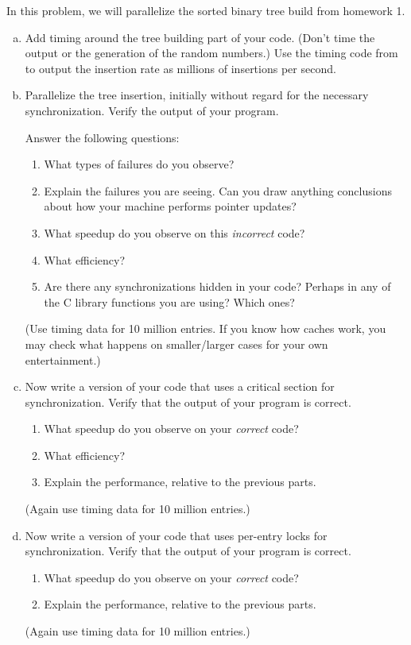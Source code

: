 \documentclass[11pt]{article}
\begin{document}

In this problem, we will parallelize the sorted binary tree build from
homework 1.

\begin{enumerate}[a)]
  \item Add timing around the tree building part of your code. (Don't
  time the output or the generation of the random numbers.)
  Use the timing code from
  to output the insertion rate as millions of insertions per second.

  \item Parallelize the tree insertion, initially without regard for
  the necessary synchronization. Verify the output of your program.

  Answer the following questions:
  \begin{enumerate}[1)]
    \item What types of failures do you observe?
    \item Explain the failures you are seeing. Can you draw anything
      conclusions about how your machine performs pointer updates?
    \item What speedup do you observe on this \emph{incorrect} code?
    \item What efficiency?
    \item Are there any synchronizations hidden in your code? Perhaps
      in any of the C library functions you are using? Which ones?
  \end{enumerate}
  (Use timing data for 10 million entries. If you know how caches
  work, you may check what happens on smaller/larger cases for your
  own entertainment.)

  \item Now write a version of your code that uses a critical section
  for synchronization. Verify that the output of your program is
  correct.
  \begin{enumerate}[1)]
    \item What speedup do you observe on your \emph{correct} code?
    \item What efficiency?
    \item Explain the performance, relative to the previous
    parts.
  \end{enumerate}
  (Again use timing data for 10 million entries.)

  \item Now write a version of your code that uses per-entry locks
  for synchronization. Verify that the output of your program is
  correct.
  \begin{enumerate}[1)]
    \item What speedup do you observe on your \emph{correct} code?
    \item Explain the performance, relative to the previous
    parts.
  \end{enumerate}
  (Again use timing data for 10 million entries.)


\end{enumerate}
\end{document}
